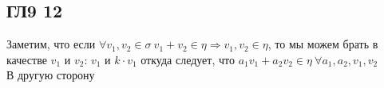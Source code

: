 \subsection*{ГЛ9 12}
Заметим, что если $\forall v_{1}, v_{2} \in \sigma\ v_{1}+v_{2} \in \eta \Rightarrow v_{1}, v_{2} \in \eta$, то мы можем брать в качестве $v_1$ и $v_2$: $v_1$ и $k \cdot v_1$ откуда следует, что $a_1v_1 + a_2v_2 \in \eta\ \forall a_1, a_2, v_1, v_2$\\
В другую сторону
		